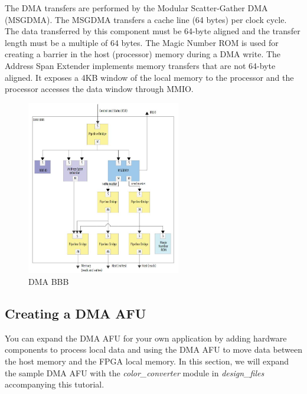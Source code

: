 \documentclass[11pt, twoside, pdftex]{article}
\begin{document}
The DMA transfers are performed by the Modular Scatter-Gather DMA (MSGDMA). The MSGDMA transfers a cache line (64 bytes) per clock cycle. The data transferred by this component must be 64-byte aligned and the transfer length must be a multiple of 64 bytes. The Magic Number ROM is used for creating a barrier in the host (processor) memory during a DMA write. The Address Span Extender implements memory transfers that are not 64-byte aligned. It exposes a 4KB window of the local memory to the processor and the processor accesses the data window through MMIO.

\begin{figure}[H]
    \centering
    \includegraphics[width=0.6\textwidth]{figures/DMABBB.JPG}
    \caption{DMA BBB}
    \label{fig:dmaBBB}
\end{figure}

\subsection{Creating a DMA AFU}
You can expand the DMA AFU for your own application by adding hardware components to process local data and using the DMA AFU to move data between the host memory and the FPGA local memory. In this section, we will expand the sample DMA AFU with the {\it color\_converter} module in {\it design\_files} accompanying this tutorial.
\end{document}
